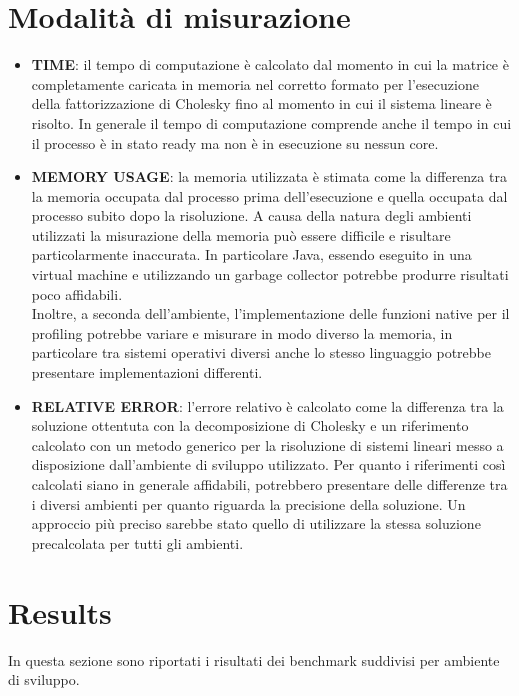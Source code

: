 \documentclass{report}
\begin{document}
        \section{Modalità di misurazione}
            \begin{itemize}
                \item \textbf{TIME}: il tempo di computazione è calcolato dal momento in cui la matrice è completamente
                caricata in memoria nel corretto formato per l'esecuzione della fattorizzazione di Cholesky fino al 
                momento in cui il sistema lineare è risolto. In generale il tempo di computazione comprende anche il 
                tempo in cui il processo è in stato ready ma non è in esecuzione su nessun core.
                \item \textbf{MEMORY USAGE}: la memoria utilizzata è stimata come la differenza tra la memoria occupata 
                dal processo prima dell'esecuzione e quella occupata dal processo subito dopo la risoluzione.
                A causa della natura degli ambienti utilizzati la misurazione della memoria può essere difficile e 
                risultare particolarmente inaccurata. In particolare Java, essendo eseguito in una virtual machine e
                utilizzando un garbage collector potrebbe produrre risultati poco affidabili.\\
                Inoltre, a seconda dell'ambiente, l'implementazione delle funzioni native per il profiling potrebbe 
                variare e misurare in modo diverso la memoria, in particolare tra sistemi operativi diversi anche lo 
                stesso linguaggio potrebbe presentare implementazioni differenti.
                \item \textbf{RELATIVE ERROR}: l'errore relativo è calcolato come la differenza tra la soluzione 
                ottentuta con la decomposizione di Cholesky e un riferimento calcolato con un metodo generico per la
                risoluzione di sistemi lineari messo a disposizione dall'ambiente di sviluppo utilizzato.
                Per quanto i riferimenti così calcolati siano in generale affidabili, potrebbero presentare delle 
                differenze tra i diversi ambienti per quanto riguarda la precisione della soluzione. 
                Un approccio più preciso sarebbe stato quello di utilizzare la stessa soluzione precalcolata per tutti 
                gli ambienti.
            \end{itemize}
        
        \section{Results}
            In questa sezione sono riportati i risultati dei benchmark suddivisi per ambiente di sviluppo.
\end{document}
